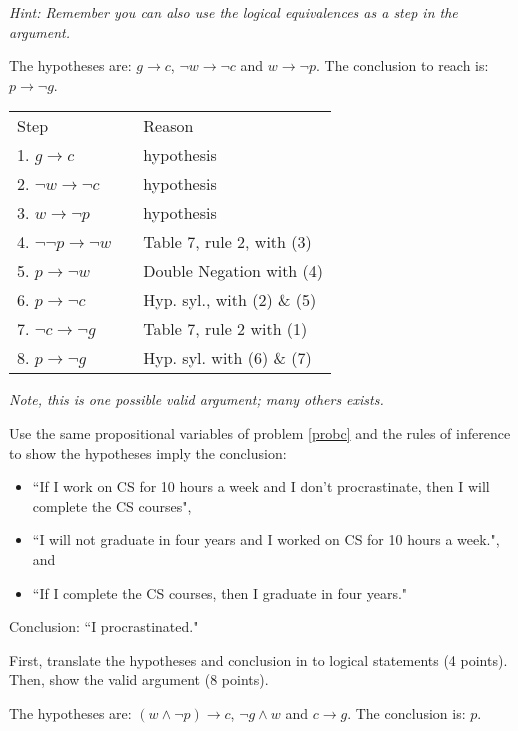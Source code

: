 \documentclass[10pt,addpoints]{exam}
\newcommand{\ra}{\rightarrow}
\begin{document}
\begin{questions}
\textit{Hint: Remember you can also use the logical equivalences as a step in the argument.}
    \ifprintanswers
        \vspace{-12pt}
    \fi
\begin{solution}
    The hypotheses are: $g \ra c$, $\neg w \ra \neg c$ and $w \ra \neg p$.
    The conclusion to reach is: $p \ra \neg g$.

    \begin{tabular}{lll}
        Step    & \hspace{0.2in} & Reason \\
        1. $g \ra c$           			& & hypothesis \\
        2. $\neg w \ra \neg c$          & & hypothesis \\
        3. $w \ra \neg p$           	& & hypothesis \\
        4. $\neg \neg p \ra \neg w$ 	& & Table 7, rule 2, with (3) \\
        5. $p \ra \neg w$				& & Double Negation with (4) \\
        6. $p \ra \neg c$               & & Hyp. syl., with (2) \& (5) \\
        7. $\neg c \ra \neg g$          & & Table 7, rule 2 with (1) \\
        8. $p \ra \neg g$				& & Hyp. syl. with (6) \& (7)
    \end{tabular}
    
    \emph{Note, this is one possible valid argument; many others exists.}
\end{solution}


\question[12] Use the same propositional variables of problem \ref{probc} and the rules of inference to show the hypotheses imply the conclusion:
\begin{itemize}[itemsep=0pt,parsep=0pt,topsep=0pt,partopsep=0pt]
    \item ``If I work on CS for 10 hours a week and I don't procrastinate, then I will complete the CS courses",
    \item ``I will not graduate in four years and I worked on CS for 10 hours a week.", and
    \item ``If I complete the CS courses, then I graduate in four years."
\end{itemize}
Conclusion:  ``I procrastinated."

First, translate the hypotheses and conclusion in to logical statements (4 points).  Then, show the valid argument (8 points).
    \ifprintanswers
        \vspace{-12pt}
    \fi
\begin{solution}
    The hypotheses are: $(w \wedge \neg p) \ra c$, $\neg g \wedge w$ and $c \ra g$.
    The conclusion is: $p$.


\end{solution}
\end{questions}
\end{document}

